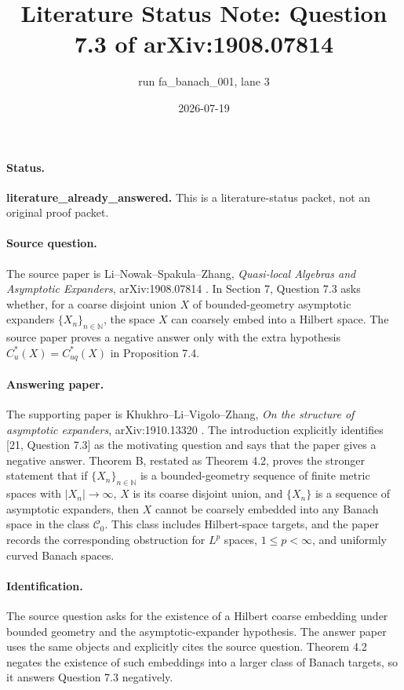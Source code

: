 \documentclass[11pt]{article}
\title{Literature Status Note: Question 7.3 of arXiv:1908.07814}
\author{run fa\_banach\_001, lane 3}
\date{2026-07-19}
\begin{document}
\maketitle

\paragraph{Status.}
\textbf{literature\_already\_answered.} This is a literature-status packet, not
an original proof packet.

\paragraph{Source question.}
The source paper is Li--Nowak--Spakula--Zhang, \emph{Quasi-local Algebras and
Asymptotic Expanders}, arXiv:1908.07814 \cite{LNSZ}. In Section 7, Question 7.3
asks whether, for a coarse disjoint union $X$ of bounded-geometry asymptotic
expanders $\{X_n\}_{n\in\mathbb N}$, the space $X$ can coarsely embed into a
Hilbert space. The source paper proves a negative answer only with the extra
hypothesis $C_u^*(X)=C_{uq}^*(X)$ in Proposition 7.4.

\paragraph{Answering paper.}
The supporting paper is Khukhro--Li--Vigolo--Zhang, \emph{On the structure of
asymptotic expanders}, arXiv:1910.13320 \cite{KLVZ}. The introduction explicitly
identifies [21, Question 7.3] as the motivating question and says that the paper
gives a negative answer. Theorem B, restated as Theorem 4.2, proves the stronger
statement that if $\{X_n\}_{n\in\mathbb N}$ is a bounded-geometry sequence of
finite metric spaces with $|X_n|\to\infty$, $X$ is its coarse disjoint union, and
$\{X_n\}$ is a sequence of asymptotic expanders, then $X$ cannot be coarsely
embedded into any Banach space in the class $\mathcal C_0$. This class includes
Hilbert-space targets, and the paper records the corresponding obstruction for
$L^p$ spaces, $1\le p<\infty$, and uniformly curved Banach spaces.

\paragraph{Identification.}
The source question asks for the existence of a Hilbert coarse embedding under
bounded geometry and the asymptotic-expander hypothesis. The answer paper uses
the same objects and explicitly cites the source question. Theorem 4.2 negates
the existence of such embeddings into a larger class of Banach targets, so it
answers Question 7.3 negatively.
\end{document}
